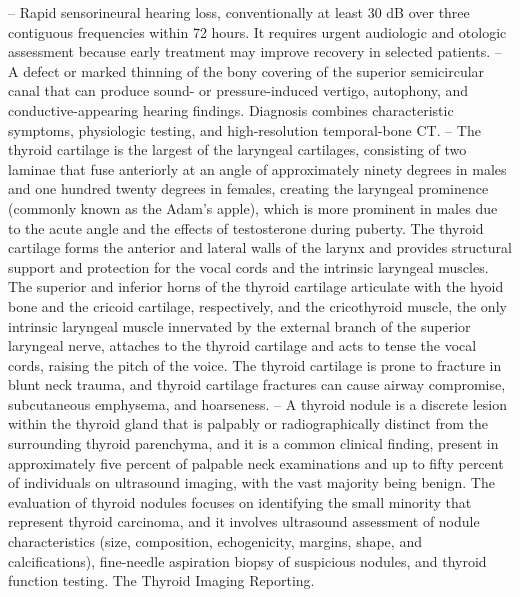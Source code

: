 -- Rapid sensorineural hearing loss, conventionally at least 30 dB over three contiguous frequencies within 72 hours. It requires urgent audiologic and otologic assessment because early treatment may improve recovery in selected patients.
-- A defect or marked thinning of the bony covering of the superior semicircular canal that can produce sound- or pressure-induced vertigo, autophony, and conductive-appearing hearing findings. Diagnosis combines characteristic symptoms, physiologic testing, and high-resolution temporal-bone CT.
-- The thyroid cartilage is the largest of the laryngeal cartilages, consisting of two laminae that fuse anteriorly at an angle of approximately ninety degrees in males and one hundred twenty degrees in females, creating the laryngeal prominence (commonly known as the Adam’s apple), which is more prominent in males due to the acute angle and the effects of testosterone during puberty. The thyroid cartilage forms the anterior and lateral walls of the larynx and provides structural support and protection for the vocal cords and the intrinsic laryngeal muscles. The superior and inferior horns of the thyroid cartilage articulate with the hyoid bone and the cricoid cartilage, respectively, and the cricothyroid muscle, the only intrinsic laryngeal muscle innervated by the external branch of the superior laryngeal nerve, attaches to the thyroid cartilage and acts to tense the vocal cords, raising the pitch of the voice. The thyroid cartilage is prone to fracture in blunt neck trauma, and thyroid cartilage fractures can cause airway compromise, subcutaneous emphysema, and hoarseness.
-- A thyroid nodule is a discrete lesion within the thyroid gland that is palpably or radiographically distinct from the surrounding thyroid parenchyma, and it is a common clinical finding, present in approximately five percent of palpable neck examinations and up to fifty percent of individuals on ultrasound imaging, with the vast majority being benign. The evaluation of thyroid nodules focuses on identifying the small minority that represent thyroid carcinoma, and it involves ultrasound assessment of nodule characteristics (size, composition, echogenicity, margins, shape, and calcifications), fine-needle aspiration biopsy of suspicious nodules, and thyroid function testing. The Thyroid Imaging Reporting.

